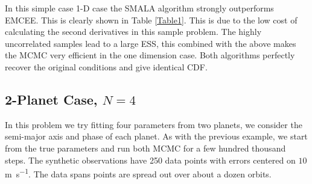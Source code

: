 \documentclass{aa}
\begin{document}
In this simple case 1-D case the SMALA algorithm strongly outperforms EMCEE. This is clearly shown in Table \ref{Table1}. This is due to the low cost of calculating the second derivatives in this sample problem. The highly uncorrelated samples lead to a large ESS, this combined with the above makes the MCMC very efficient in the one dimension case. Both algorithms perfectly recover the original conditions and give identical CDF.

\begin{table}
\caption{MCMC Efficiency Results}             %
\label{Table1}      %
\centering                          %
\end{table}

\subsection{2-Planet Case, $N=4$}

In this problem we try fitting four parameters from two planets, we consider the semi-major axis and phase of each planet. As with the previous example, we start from the true parameters and run both MCMC for a few hundred thousand steps. The synthetic observations have 250 data points with errors centered on $10$ \si{\metre\per\second}. The data spans points are spread out over about a dozen orbits.
\end{document}
